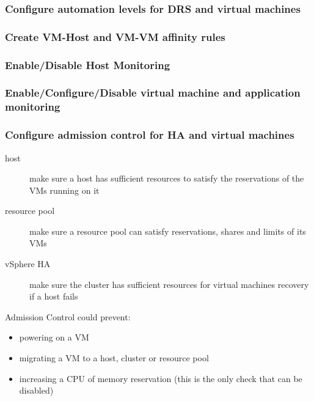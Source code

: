 \subsubsection{Configure automation levels for DRS and virtual machines}

\subsubsection{Create VM-Host and VM-VM affinity rules}

\subsubsection{Enable/Disable Host Monitoring}

\subsubsection{Enable/Configure/Disable virtual machine and application monitoring}

\subsubsection{Configure admission control for HA and virtual machines}

\begin{description}

\item[host]
make sure a host has sufficient resources to satisfy the reservations of the
VMs running on it

\item[resource pool]
make sure a resource pool can satisfy reservations, shares and limits of its
VMs

\item[vSphere HA]
make sure the cluster has sufficient resources for virtual machines recovery
if a host fails

\end{description}

Admission Control could prevent:

\begin{itemize}
\item powering on a VM
\item migrating a VM to a host, cluster or resource pool
\item increasing a CPU of memory reservation (this is the only check that can
be disabled)
\end{itemize}

